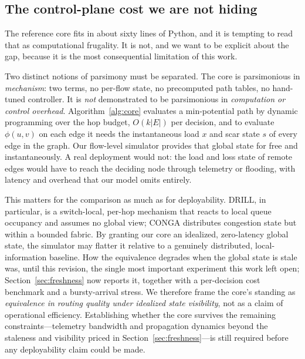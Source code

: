 \subsection{The control-plane cost we are not hiding}
\label{sec:control-plane}

The reference core fits in about sixty lines of Python, and it is tempting to
read that as computational frugality. It is not, and we want to be explicit
about the gap, because it is the most consequential limitation of this work.

Two distinct notions of parsimony must be separated. The core is parsimonious in
\emph{mechanism}: two terms, no per-flow state, no precomputed path tables, no
hand-tuned controller. It is \emph{not} demonstrated to be parsimonious in
\emph{computation or control overhead}. Algorithm~\ref{alg:core} evaluates a
min-potential path by dynamic programming over the hop budget, $O(k|E|)$ per
decision, and to evaluate $\phi(u,v)$ on each edge it needs the instantaneous
load $x$ and scar state $s$ of every edge in the graph. Our flow-level simulator
provides that global state for free and instantaneously. A real deployment would
not: the load and loss state of remote edges would have to reach the deciding
node through telemetry or flooding, with latency and overhead that our model
omits entirely.

This matters for the comparison as much as for deployability. DRILL, in
particular, is a switch-local, per-hop mechanism that reacts to local queue
occupancy and assumes no global view; CONGA distributes congestion state but
within a bounded fabric. By granting our core an idealized, zero-latency global
state, the simulator may flatter it relative to a genuinely distributed,
local-information baseline. How the equivalence degrades when the global state is stale was, until this revision, the single most important experiment this work left open; Section~\ref{sec:freshness} now reports it, together with a per-decision cost benchmark and a bursty-arrival stress. We therefore frame the core's standing as
\emph{equivalence in routing quality under idealized state visibility}, not as a
claim of operational efficiency. Establishing whether the core survives the remaining constraints---telemetry bandwidth and propagation dynamics beyond the staleness and visibility priced in Section~\ref{sec:freshness}---is still required before any deployability claim could be made.

